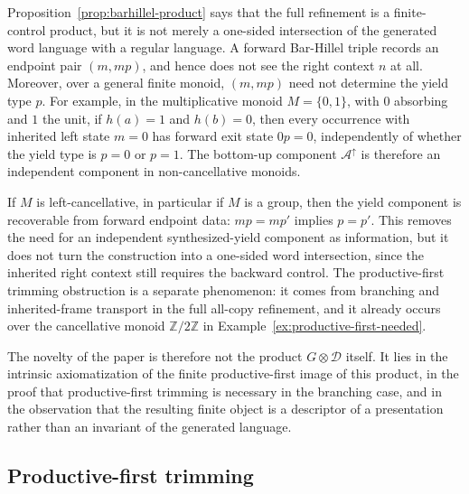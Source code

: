 \documentclass[sub]{jalc}
\begin{document}
\begin{remark}
\label{rem:not-one-sided-intersection}
Proposition~\ref{prop:barhillel-product} says that the full refinement is a
finite-control product, but it is not merely a one-sided intersection of the
generated word language with a regular language.  A forward Bar-Hillel triple
records an endpoint pair \((m,mp)\), and hence does not see the right context
\(n\) at all.  Moreover, over a general finite monoid, \((m,mp)\) need not
determine the yield type \(p\).  For example, in the multiplicative monoid
\(M=\{0,1\}\), with \(0\) absorbing and \(1\) the unit, if \(h(a)=1\) and
\(h(b)=0\), then every occurrence with inherited left state \(m=0\) has forward
exit state \(0p=0\), independently of whether the yield type is \(p=0\) or
\(p=1\).  The bottom-up component \(\mathcal A^{\uparrow}\) is therefore an
independent component in non-cancellative monoids.

If \(M\) is left-cancellative, in particular if \(M\) is a group, then the yield
component is recoverable from forward endpoint data: \(mp=mp'\) implies
\(p=p'\).  This removes the need for an independent synthesized-yield component
as information, but it does not turn the construction into a one-sided word
intersection, since the inherited right context still requires the backward
control.  The productive-first trimming obstruction is a separate phenomenon:
it comes from branching and inherited-frame transport in the full all-copy
refinement, and it already occurs over the cancellative monoid
\(\mathbb Z/2\mathbb Z\) in Example~\ref{ex:productive-first-needed}.
\end{remark}

The novelty of the paper is therefore not the product \(G\otimes\mathcal D\)
itself.  It lies in the intrinsic axiomatization of the finite productive-first
image of this product, in the proof that productive-first trimming is necessary
in the branching case, and in the observation that the resulting finite object
is a descriptor of a presentation rather than an invariant of the generated
language.


\subsection{Productive-first trimming}
\label{subsec:productive-first}
\end{document}
